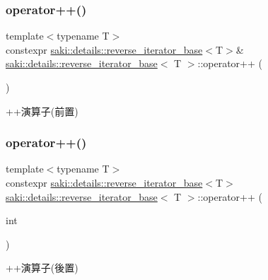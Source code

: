 \subsubsection{\texorpdfstring{operator++()}{operator++()}\hspace{0.1cm}{\footnotesize\ttfamily [1/2]}}
{\footnotesize\ttfamily template$<$typename T$>$ \\
constexpr \mbox{\hyperlink{classsaki_1_1details_1_1reverse__iterator__base}{saki\+::details\+::reverse\+\_\+iterator\+\_\+base}}$<$T$>$\& \mbox{\hyperlink{classsaki_1_1details_1_1reverse__iterator__base}{saki\+::details\+::reverse\+\_\+iterator\+\_\+base}}$<$ T $>$\+::operator++ (\begin{DoxyParamCaption}{ }\end{DoxyParamCaption})\hspace{0.3cm}{\ttfamily [inline]}}



++演算子(前置) 

\mbox{\label{classsaki_1_1details_1_1reverse__iterator__base_a7cd2bc5d74938f93c2b07e059068f830}} 
\subsubsection{\texorpdfstring{operator++()}{operator++()}\hspace{0.1cm}{\footnotesize\ttfamily [2/2]}}
{\footnotesize\ttfamily template$<$typename T$>$ \\
constexpr \mbox{\hyperlink{classsaki_1_1details_1_1reverse__iterator__base}{saki\+::details\+::reverse\+\_\+iterator\+\_\+base}}$<$T$>$ \mbox{\hyperlink{classsaki_1_1details_1_1reverse__iterator__base}{saki\+::details\+::reverse\+\_\+iterator\+\_\+base}}$<$ T $>$\+::operator++ (\begin{DoxyParamCaption}\item[{int}]{ }\end{DoxyParamCaption})\hspace{0.3cm}{\ttfamily [inline]}}



++演算子(後置) 

\mbox{\label{classsaki_1_1details_1_1reverse__iterator__base_aea4bcf44b41d1d5cdb37a630ed9a2e4e}} 
